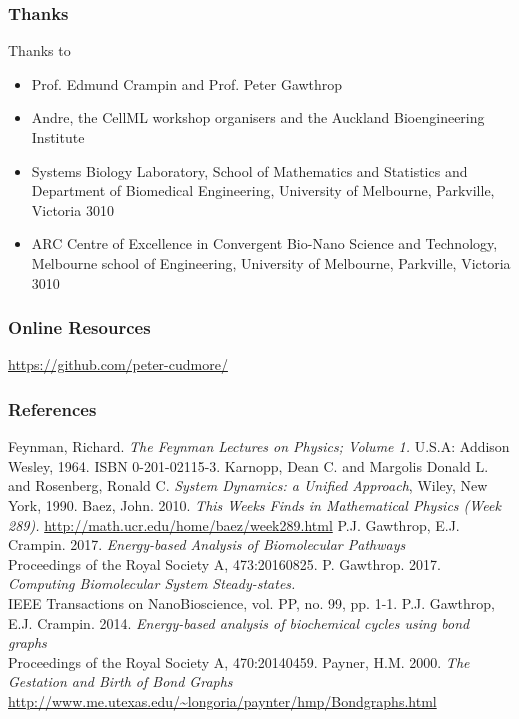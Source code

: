\documentclass[11pt,reqno]{beamer}
\begin{document}
\begin{frame}
\frametitle{Thanks}
{\small
Thanks to
\begin{itemize}
		\itemsep1em
	\item Prof. Edmund Crampin and Prof. Peter Gawthrop
	\item Andre, the CellML workshop organisers and the Auckland Bioengineering Institute
\item Systems Biology Laboratory, School of Mathematics and Statistics and Department of Biomedical Engineering, University of Melbourne, Parkville, Victoria 3010
\item ARC Centre of Excellence in Convergent Bio-Nano Science and Technology,
Melbourne school of Engineering, 
University of Melbourne, Parkville, Victoria 3010
\end{itemize}
}
\end{frame}
\begin{frame}
\frametitle{Online Resources}
\url{https://github.com/peter-cudmore/}
\end{frame}
\begin{frame}
\frametitle{References}
{\tiny
	\begin{thebibliography}{6}
		 Feynman, Richard. \emph{The Feynman Lectures on Physics; Volume 1.} U.S.A: Addison Wesley, 1964. ISBN 0-201-02115-3.
		 Karnopp, Dean C. and Margolis Donald L. and Rosenberg, Ronald C. \emph{System Dynamics: a Unified Approach}, Wiley, New York, 1990.
		 Baez, John. 2010. \emph{This Weeks Finds in Mathematical Physics (Week 289).} \url{http://math.ucr.edu/home/baez/week289.html}
		  P.J. Gawthrop, E.J. Crampin. 2017. \emph{Energy-based Analysis of Biomolecular Pathways}\\
		Proceedings of the Royal Society A, 473:20160825.
		 P. Gawthrop. 2017. \emph{Computing Biomolecular System Steady-states.}\\
		IEEE Transactions on NanoBioscience, vol. PP, no. 99, pp. 1-1. 
		 P.J. Gawthrop, E.J. Crampin. 2014. \emph{Energy-based analysis of biochemical cycles using bond graphs}\\
		Proceedings of the Royal Society A, 470:20140459.
		 Payner, H.M. 2000. \emph{The Gestation and Birth of Bond Graphs} \url{http://www.me.utexas.edu/\~longoria/paynter/hmp/Bondgraphs.html}
\end{thebibliography}}
\end{frame}
\end{document}
